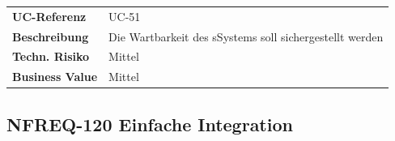 \begin{longtable}[c]{@{}ll@{}}
\toprule
\begin{minipage}[t]{0.20\columnwidth}\raggedright\strut
\textbf{UC-Referenz}
\strut\end{minipage} &
\begin{minipage}[t]{0.74\columnwidth}\raggedright\strut
UC-51
\strut\end{minipage}\tabularnewline
\begin{minipage}[t]{0.20\columnwidth}\raggedright\strut
\textbf{Beschreibung}
\strut\end{minipage} &
\begin{minipage}[t]{0.74\columnwidth}\raggedright\strut
Die Wartbarkeit des sSystems soll sichergestellt werden
\strut\end{minipage}\tabularnewline
\begin{minipage}[t]{0.20\columnwidth}\raggedright\strut
\textbf{Techn. Risiko}
\strut\end{minipage} &
\begin{minipage}[t]{0.74\columnwidth}\raggedright\strut
Mittel
\strut\end{minipage}\tabularnewline
\begin{minipage}[t]{0.20\columnwidth}\raggedright\strut
\textbf{Business Value}
\strut\end{minipage} &
\begin{minipage}[t]{0.74\columnwidth}\raggedright\strut
Mittel
\strut\end{minipage}\tabularnewline
\bottomrule
\end{longtable}

\subsection{NFREQ-120 Einfache
Integration}\label{nfreq-120-einfache-integration}

